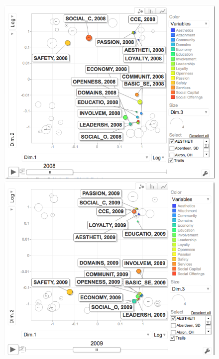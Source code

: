 \documentclass[11pt]{asaproc}
\begin{document}
\begin{figure}[H]
\begin{framed}
\begin{minipage}[b]{0.45\linewidth}
\centering
\includegraphics[width=\textwidth]{pcasd08.png}
\end{minipage}
\hspace{0.5cm}
\begin{minipage}[b]{0.45\linewidth}
\centering
\includegraphics[width=\textwidth]{pcasd09.png}
\end{minipage}

\end{framed}
\end{figure}
\end{document}
